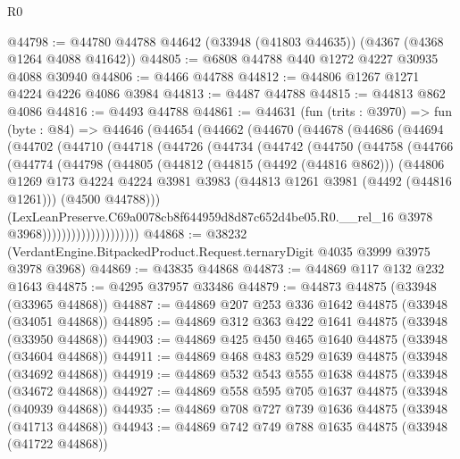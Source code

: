 \begin{lexlean}{R0}
\begin{coremodule}
@44798 := @44780 @44788 @44642 (@33948 (@41803 @44635)) (@4367 (@4368 @1264 @4088 @41642))
@44805 := @6808 @44788 @440 @1272 @4227 @30935 @4088 @30940
@44806 := @4466 @44788
@44812 := @44806 @1267 @1271 @4224 @4226 @4086 @3984
@44813 := @4487 @44788
@44815 := @44813 @862 @4086
@44816 := @4493 @44788
@44861 := @44631
    (fun (trits : @3970) =>
    fun (byte : @84) =>
    @44646
      (@44654
        (@44662
          (@44670
            (@44678
              (@44686
                (@44694
                  (@44702
                    (@44710
                      (@44718
                        (@44726
                          (@44734
                            (@44742
                              (@44750
                                (@44758
                                  (@44766
                                    (@44774
                                      (@44798
                                        (@44805
                                          (@44812
                                            (@44815 (@4492 (@44816 @862)))
                                            (@44806
                                              @1269
                                              @173
                                              @4224
                                              @4224
                                              @3981
                                              @3983
                                              (@44813 @1261 @3981 (@4492 (@44816 @1261)))
                                              (@4500 @44788)))
                                          (LexLeanPreserve.C69a0078cb8f644959d8d87c652d4be05.R0.__rel_16
                                            @3978
                                            @3968))))))))))))))))))))
@44868 := @38232 (VerdantEngine.BitpackedProduct.Request.ternaryDigit @4035 @3999 @3975 @3978 @3968)
@44869 := @43835 @44868
@44873 := @44869 @117 @132 @232 @1643
@44875 := @4295 @37957 @33486
@44879 := @44873 @44875 (@33948 (@33965 @44868))
@44887 := @44869 @207 @253 @336 @1642 @44875 (@33948 (@34051 @44868))
@44895 := @44869 @312 @363 @422 @1641 @44875 (@33948 (@33950 @44868))
@44903 := @44869 @425 @450 @465 @1640 @44875 (@33948 (@34604 @44868))
@44911 := @44869 @468 @483 @529 @1639 @44875 (@33948 (@34692 @44868))
@44919 := @44869 @532 @543 @555 @1638 @44875 (@33948 (@34672 @44868))
@44927 := @44869 @558 @595 @705 @1637 @44875 (@33948 (@40939 @44868))
@44935 := @44869 @708 @727 @739 @1636 @44875 (@33948 (@41713 @44868))
@44943 := @44869 @742 @749 @788 @1635 @44875 (@33948 (@41722 @44868))

\end{coremodule}
\end{lexlean}
